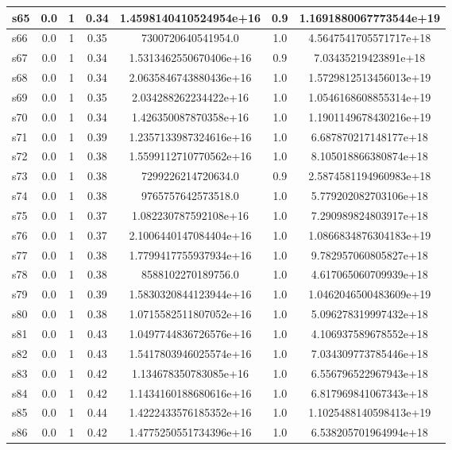 \documentclass{article}
\begin{document}
\begin{tabular}{|l|c|c|c|c|c|c|}
\hline
s65 &0.0 & 1 & 0.34 & 1.4598140410524954e+16 & 0.9 & 1.1691880067773544e+19\\
\hline
s66 &0.0 & 1 & 0.35 & 7300720640541954.0 & 1.0 & 4.5647541705571717e+18\\
\hline
s67 &0.0 & 1 & 0.34 & 1.5313462550670406e+16 & 0.9 & 7.03435219423891e+18\\
\hline
s68 &0.0 & 1 & 0.34 & 2.0635846743880436e+16 & 1.0 & 1.5729812513456013e+19\\
\hline
s69 &0.0 & 1 & 0.35 & 2.034288262234422e+16 & 1.0 & 1.0546168608855314e+19\\
\hline
s70 &0.0 & 1 & 0.34 & 1.426350087870358e+16 & 1.0 & 1.1901149678430216e+19\\
\hline
s71 &0.0 & 1 & 0.39 & 1.2357133987324616e+16 & 1.0 & 6.687870217148177e+18\\
\hline
s72 &0.0 & 1 & 0.38 & 1.5599112710770562e+16 & 1.0 & 8.105018866380874e+18\\
\hline
s73 &0.0 & 1 & 0.38 & 7299226214720634.0 & 0.9 & 2.5874581194960983e+18\\
\hline
s74 &0.0 & 1 & 0.38 & 9765757642573518.0 & 1.0 & 5.779202082703106e+18\\
\hline
s75 &0.0 & 1 & 0.37 & 1.082230787592108e+16 & 1.0 & 7.290989824803917e+18\\
\hline
s76 &0.0 & 1 & 0.37 & 2.1006440147084404e+16 & 1.0 & 1.0866834876304183e+19\\
\hline
s77 &0.0 & 1 & 0.38 & 1.7799417755937934e+16 & 1.0 & 9.782957060805827e+18\\
\hline
s78 &0.0 & 1 & 0.38 & 8588102270189756.0 & 1.0 & 4.617065060709939e+18\\
\hline
s79 &0.0 & 1 & 0.39 & 1.5830320844123944e+16 & 1.0 & 1.0462046500483609e+19\\
\hline
s80 &0.0 & 1 & 0.38 & 1.0715582511807052e+16 & 1.0 & 5.096278319997432e+18\\
\hline
s81 &0.0 & 1 & 0.43 & 1.0497744836726576e+16 & 1.0 & 4.106937589678552e+18\\
\hline
s82 &0.0 & 1 & 0.43 & 1.5417803946025574e+16 & 1.0 & 7.034309773785446e+18\\
\hline
s83 &0.0 & 1 & 0.42 & 1.134678350783085e+16 & 1.0 & 6.556796522967943e+18\\
\hline
s84 &0.0 & 1 & 0.42 & 1.1434160188680616e+16 & 1.0 & 6.817969841067343e+18\\
\hline
s85 &0.0 & 1 & 0.44 & 1.4222433576185352e+16 & 1.0 & 1.1025488140598413e+19\\
\hline
s86 &0.0 & 1 & 0.42 & 1.4775250551734396e+16 & 1.0 & 6.538205701964994e+18\\

\end{tabular}
\end{document}
